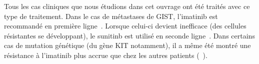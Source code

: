 \documentclass[main.tex]{subfiles}
\begin{document}
Tous les cas cliniques que nous étudions dans cet ouvrage ont été traités avec ce type de traitement. Dans le cas de métastases de GIST, l'imatinib est recommandé en première ligne~\cite{demetri2002efficacy}. 
Lorsque celui-ci devient inefficace %
(des cellules résistantes se développant), le sunitinb est utilisé en seconde ligne~\cite{Demetri20061329,saltz2007phase,houk2010relationship}. 
Dans certains cas de mutation génétique (du gène KIT notamment), il a même été montré une résistance à l'imatinib plus accrue que chez les autres patients (\cf~\cite{rubin2001kit,lux2000kit,lasota2000mutations}).

%
%
\end{document}
